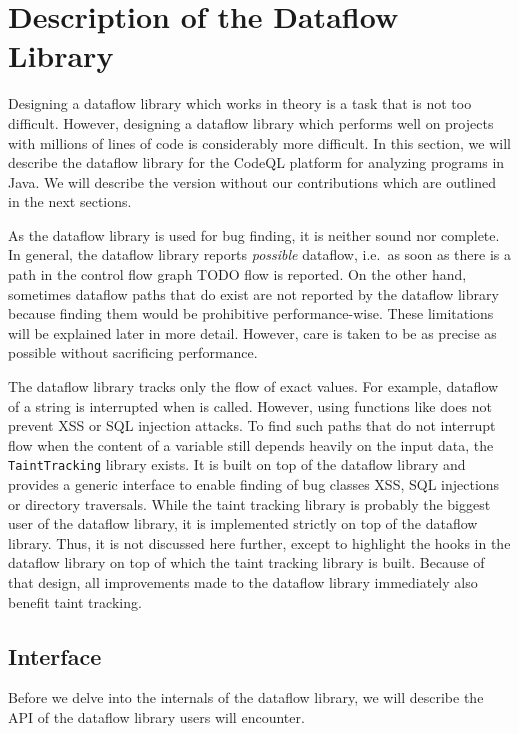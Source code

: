 \section{Description of the Dataflow Library}
Designing a dataflow library which works in theory is a task that is not too difficult.
However, designing a dataflow library which performs well on projects with millions of lines of code is 
considerably more difficult.
In this section, we will describe the dataflow library for the CodeQL platform %
for analyzing programs in Java.
We will describe the version without our contributions which are outlined in the next sections.

As the dataflow library is used for bug finding, it is neither sound nor complete.
In general, the dataflow library reports \emph{possible} dataflow, i.e.\ as soon
as there is a path in the control flow graph TODO flow is reported.
On the other hand, sometimes dataflow paths that do exist are not reported by the 
dataflow library because finding them would be prohibitive performance-wise.
These limitations will be explained later in more detail.
However, care is taken to be as precise as possible without sacrificing performance. 

The dataflow library tracks only the flow of exact values.
For example, dataflow of a string is interrupted when  is called.
However, using functions like  does not prevent XSS or SQL injection attacks.
To find such paths that do not interrupt flow when the content of a variable still depends 
heavily on the input data, the \texttt{TaintTracking} library exists.
It is built on top of the dataflow library and provides a generic interface to enable
finding of bug classes XSS, SQL injections or directory traversals.
While the taint tracking library is probably the biggest user of the dataflow library,
it is implemented strictly on top of the dataflow library.
Thus, it is not discussed here further, except to highlight the hooks in the dataflow 
library on top of which the taint tracking library is built.
Because of that design, all improvements made to the dataflow library immediately
also benefit taint tracking.

\subsection{Interface}
Before we delve into the internals of the dataflow library, we will describe the API 
of the dataflow library users will encounter. %

